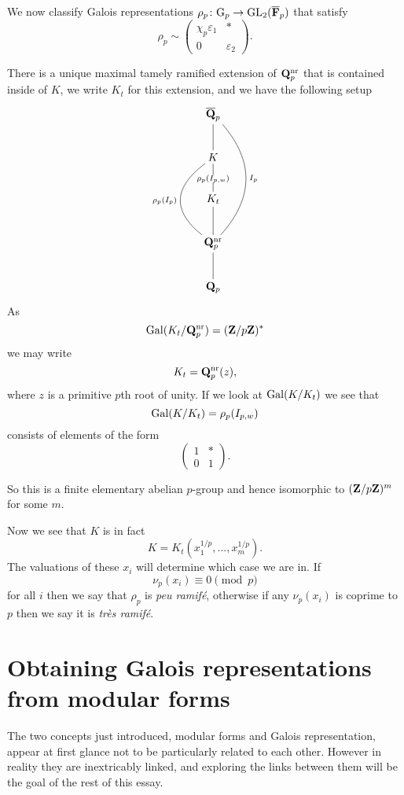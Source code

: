\documentclass[a4paper,12pt]{article}
\begin{document}
\begin{defn}
We now classify Galois representations $\rho_p\colon\mathrm{G}_p\to\operatorname{GL}_2(\overline{\mathbf{F}}_p)$ that satisfy
\[
\rho_p\sim
\begin{pmatrix}
\chi_p\varepsilon_1 & * \\
0 & \varepsilon_2\end{pmatrix}.
\]

There is a unique maximal tamely ramified extension of $\mathbf{Q}_p^{\mathrm{nr}}$ that is contained inside of $K$, we write $K_t$ for this extension, and we have the following setup %
\[
\xymatrix{
\Qpb      \ar@{-}[d] \ar@{-}@/^2.5pc/[ddd]^{I_p} \\
K      \ar@{-}[d]|{\rho_p(I_{p,w})} \ar@{-}@/_2.5pc/[dd]_{\rho_p(I_{p})}\\
K_t \ar@{-}[d] \\
\Qp^\nr \ar@{-}[d]\\
\Qp \\
}
\]
As
\[
\operatorname{Gal}(K_t/\mathbf{Q}_p^{\mathrm{nr}}) = (\mathbf{Z}/p\mathbf{Z})^*
\]
we may write
\[
K_t = \mathbf{Q}_p^{\mathrm{nr}}(z),
\]
where $z$ is a primitive $p$th root of unity.
If we look at $\operatorname{Gal}(K/K_t)$ we see that
\[
\operatorname{Gal}(K/K_t) = \rho_p(I_{p,w})
\]
consists of elements of the form
\[
\begin{pmatrix}
1 & * \\
0 & 1 \end{pmatrix}.
\]

So this is a finite elementary abelian $p$-group and hence isomorphic to $(\mathbf{Z}/p\mathbf{Z})^m$ for some $m$.

Now we see that $K$ is in fact
\[
K = K_t(x_1^{1/p},\ldots,x_m^{1/p}).
\]
The valuations of these $x_i$ will determine which case we are in.
If
\[
\nu_p(x_i) \equiv 0 \pmod{p}
\]
for all $i$ then we say that $\rho_p$ is \emph{peu ramif\'e}, otherwise if any $\nu_p(x_i)$ is coprime to $p$ then we say it is \emph{tr\`es ramif\'e}.
\end{defn}


\section{Obtaining Galois representations from modular forms}
The two concepts just introduced, modular forms and Galois representation, appear at first glance not to be particularly related to each other.
However in reality they are inextricably linked, and exploring the links between them will be the goal of the rest of this essay.
\end{document}
